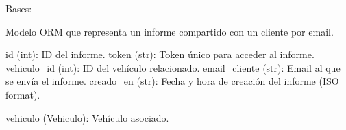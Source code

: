 \documentclass[letterpaper,10pt,spanish]{sphinxmanual}
\begin{document}
\begin{fulllineitems}
\label{\detokenize{endpoints:main.InformeCompartido}}
\pysigstartsignatures
\pysiglinewithargsret
{}
{}
{}
\pysigstopsignatures
\sphinxAtStartPar
Bases: {\hyperref[\detokenize{modelos:main.Base}]{}}

\sphinxAtStartPar
Modelo ORM que representa un informe compartido con un cliente por email.
\begin{description}
\sphinxAtStartPar
id (int): ID del informe.
token (str): Token único para acceder al informe.
vehiculo\_id (int): ID del vehículo relacionado.
email\_cliente (str): Email al que se envía el informe.
creado\_en (str): Fecha y hora de creación del informe (ISO format).

\sphinxAtStartPar
vehiculo (Vehiculo): Vehículo asociado.

\end{description}

\begin{fulllineitems}
\label{\detokenize{endpoints:main.InformeCompartido.creado_en}}
\pysigstartsignatures
\pysigline
{}
\pysigstopsignatures
\end{fulllineitems}


\begin{fulllineitems}
\label{\detokenize{endpoints:main.InformeCompartido.email_cliente}}
\pysigstartsignatures
\pysigline
{}
\pysigstopsignatures
\end{fulllineitems}


\begin{fulllineitems}
\label{\detokenize{endpoints:main.InformeCompartido.id}}
\pysigstartsignatures
\pysigline
{}
\pysigstopsignatures
\end{fulllineitems}


\end{fulllineitems}
\end{document}
